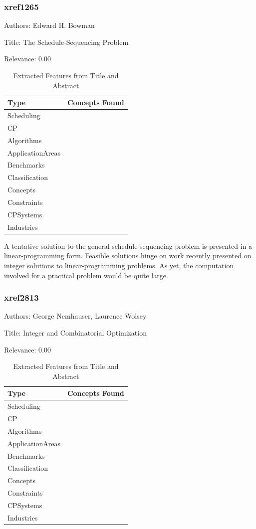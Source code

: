 \subsubsection{xref1265}
\label{mw:xref1265}

Authors: Edward H. Bowman

Title: The Schedule-Sequencing Problem

Relevance:  0.00

{\scriptsize
\begin{longtable}{p{2cm}p{20cm}}
\caption{Extracted Features from Title and Abstract}\\ \toprule
Type & Concepts Found\\ \midrule
\endhead
\bottomrule
\endfoot
Scheduling & \\ 
CP & \\ 
Algorithms & \\ 
ApplicationAreas & \\ 
Benchmarks & \\ 
Classification & \\ 
Concepts & \\ 
Constraints & \\ 
CPSystems & \\ 
Industries & \\ 
\end{longtable}
}

  A tentative solution to the general schedule-sequencing problem is presented in a linear-programming form. Feasible solutions hinge on work recently presented on integer solutions to linear-programming problems. As yet, the computation involved for a practical problem would be quite large.  

\subsubsection{xref2813}
\label{mw:xref2813}

Authors: George Nemhauser, Laurence Wolsey

Title: Integer and Combinatorial Optimization

Relevance:  0.00

{\scriptsize
\begin{longtable}{p{2cm}p{20cm}}
\caption{Extracted Features from Title and Abstract}\\ \toprule
Type & Concepts Found\\ \midrule
\endhead
\bottomrule
\endfoot
Scheduling & \\ 
CP & \\ 
Algorithms & \\ 
ApplicationAreas & \\ 
Benchmarks & \\ 
Classification & \\ 
Concepts & \\ 
Constraints & \\ 
CPSystems & \\ 
Industries & \\ 
\end{longtable}
}



